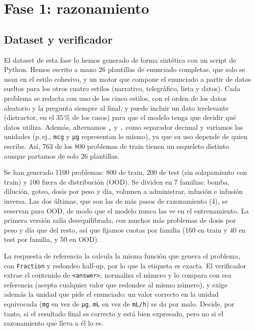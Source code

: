 \section{Fase 1: razonamiento}
\label{sec:fase1}
\subsection{Dataset y verificador}
El dataset de esta fase lo hemos generado de forma sintética con un script de Python. Hemos escrito a mano 26 plantillas de enunciado completas, que solo se usan en el estilo cohesivo, y un motor que compone el enunciado a partir de datos sueltos para los otros cuatro estilos (narrativo, telegráfico, lista y datos). Cada problema se redacta con uno de los cinco estilos, con el orden de los datos aleatorio y la pregunta siempre al final, y puede incluir un dato irrelevante (distractor, en el 35\,\% de los casos) para que el modelo tenga que decidir qué datos utiliza. Además, alternamos \texttt{,} y \texttt{.} como separador decimal y variamos las unidades (p.\,ej., \texttt{mcg} y \texttt{µg} representan lo mismo), ya que su uso depende de quien escribe. Así, 763 de los 800 problemas de train tienen un esqueleto distinto aunque partamos de solo 26 plantillas.

Se han generado 1100 problemas: 800 de train, 200 de test (sin solapamiento con train) y 100 fuera de distribución (OOD). Se dividen en 7 familias: bomba, dilución, goteo, dosis por peso y día, volumen a administrar, infusión e infusión inversa. Las dos últimas, que son las de más pasos de razonamiento (4), se reservan para OOD, de modo que el modelo nunca las ve en el entrenamiento. La primera versión salía desequilibrada, con muchos más problemas de dosis por peso y día que del resto, así que fijamos cuotas por familia (160 en train y 40 en test por familia, y 50 en OOD).

La respuesta de referencia la calcula la misma función que genera el problema, con \texttt{Fraction} y redondeo half-up, por lo que la etiqueta es exacta. El verificador extrae el contenido de \texttt{<answer>}, normaliza el número y lo compara con esa referencia (acepta cualquier valor que redondee al mismo número), y exige además la unidad que pide el enunciado: un valor correcto en la unidad equivocada (\texttt{mg} en vez de \texttt{µg}, \texttt{mL} en vez de \texttt{mL/h}) se da por malo. Decide, por tanto, si el resultado final es correcto y está bien expresado, pero no si el razonamiento que lleva a él lo es.

